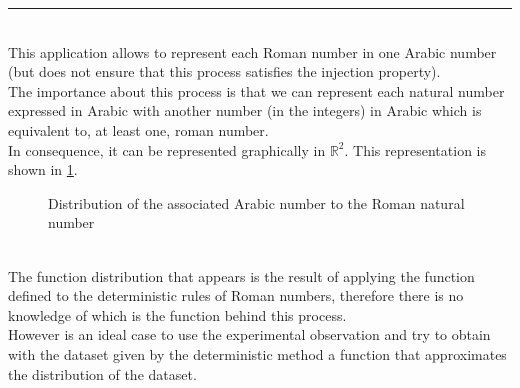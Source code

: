 \documentclass[a4paper, 11pt]{article}
\begin{document}
\rule{\linewidth}{0.4pt}\\
This application allows to represent each Roman number in one Arabic number (but does not ensure that this process satisfies the injection property).\\
The importance about this process is that we can represent each natural number expressed in Arabic with another number (in the integers) in Arabic which is equivalent to, at least one, roman number.\\
In consequence, it can be represented graphically in $\mathbb{R}^2$. This representation is shown in \ref{romans}.
\begin{figure}[h]
    \centering
    \caption{Distribution of the associated Arabic number to the Roman natural number}
    \label{romans}
\end{figure}\\
The function distribution that appears is the result of applying the function defined to the deterministic rules of Roman numbers, therefore there is no knowledge of which is the function behind this process.\\
However is an ideal case to use the experimental observation and try to obtain with the dataset given by the deterministic method a function that approximates the distribution of the dataset.
\end{document}
